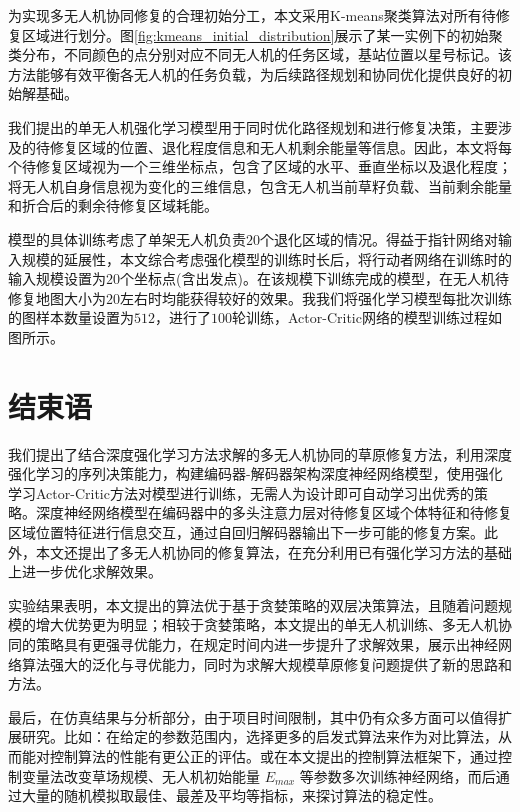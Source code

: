 \documentclass[AutoFakeBold]{LZUThesis}
\begin{document}
为实现多无人机协同修复的合理初始分工，本文采用K-means聚类算法对所有待修复区域进行划分。图\ref{fig:kmeans_initial_distribution}展示了某一实例下的初始聚类分布，不同颜色的点分别对应不同无人机的任务区域，基站位置以星号标记。该方法能够有效平衡各无人机的任务负载，为后续路径规划和协同优化提供良好的初始解基础。

我们提出的单无人机强化学习模型用于同时优化路径规划和进行修复决策，主要涉及的待修复区域的位置、退化程度信息和无人机剩余能量等信息。因此，本文将每个待修复区域视为一个三维坐标点，包含了区域的水平、垂直坐标以及退化程度；将无人机自身信息视为变化的三维信息，包含无人机当前草籽负载、当前剩余能量和折合后的剩余待修复区域耗能。

模型的具体训练考虑了单架无人机负责$20$个退化区域的情况。得益于指针网络对输入规模的延展性，本文综合考虑强化模型的训练时长后，将行动者网络在训练时的输入规模设置为$20$个坐标点(含出发点)。在该规模下训练完成的模型，在无人机待修复地图大小为$20$左右时均能获得较好的效果。我我们将强化学习模型每批次训练的图样本数量设置为$512$，进行了$100$轮训练，Actor-Critic网络的模型训练过程如图所示。

\chapter{结束语}

我们提出了结合深度强化学习方法求解的多无人机协同的草原修复方法，利用深度强化学习的序列决策能力，构建编码器-解码器架构深度神经网络模型，使用强化学习Actor-Critic方法对模型进行训练，无需人为设计即可自动学习出优秀的策略。深度神经网络模型在编码器中的多头注意力层对待修复区域个体特征和待修复区域位置特征进行信息交互，通过自回归解码器输出下一步可能的修复方案。此外，本文还提出了多无人机协同的修复算法，在充分利用已有强化学习方法的基础上进一步优化求解效果。

实验结果表明，本文提出的算法优于基于贪婪策略的双层决策算法，且随着问题规模的增大优势更为明显；相较于贪婪策略，本文提出的单无人机训练、多无人机协同的策略具有更强寻优能力，在规定时间内进一步提升了求解效果，展示出神经网络算法强大的泛化与寻优能力，同时为求解大规模草原修复问题提供了新的思路和方法。

最后，在仿真结果与分析部分，由于项目时间限制，其中仍有众多方面可以值得扩展研究。比如：在给定的参数范围内，选择更多的启发式算法来作为对比算法，从而能对控制算法的性能有更公正的评估。或在本文提出的控制算法框架下，通过控制变量法改变草场规模、无人机初始能量 $E_{max}$ 等参数多次训练神经网络，而后通过大量的随机模拟取最佳、最差及平均等指标，来探讨算法的稳定性。

\end{document}
